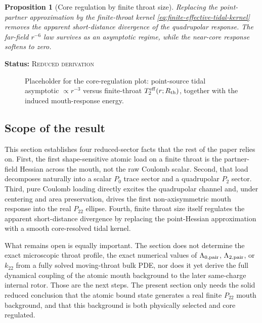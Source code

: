 \documentclass[11pt]{article}
\theoremstyle{plain}
\newtheorem{proposition}[theorem]{Proposition}
\theoremstyle{definition}
\theoremstyle{remark}
\newcommand{\statusReduced}{\textsc{Reduced derivation}}
\newcommand{\claimstatus}[1]{\par\smallskip\noindent\textbf{Status:} #1\par\smallskip}
\newcommand{\Ptwotwo}{P_{22}}
\newcommand{\Rth}{R_{\mathrm{th}}}
\begin{document}
\begin{proposition}[Core regulation by finite throat size]\label{prop:finite-core-regulation}
Replacing the point-partner approximation by the finite-throat kernel \cref{eq:finite-effective-tidal-kernel} removes the apparent short-distance divergence of the quadrupolar response. The far-field $r^{-6}$ law survives as an asymptotic regime, while the near-core response softens to zero.
\end{proposition}
\claimstatus{\statusReduced}

\begin{figure}[t]
    \centering
    \fbox{\rule{0pt}{1.8in}\rule{0.92\linewidth}{0pt}}
    \caption{Placeholder for the core-regulation plot: point-source tidal asymptotic $\propto r^{-3}$ versus finite-throat $T_2^{\rm eff}(r;\Rth)$, together with the induced mouth-response energy.}
    \label{fig:finite-core-reg}
\end{figure}

\subsection{Scope of the result}\label{subsec:finite-response-scope}

This section establishes four reduced-sector facts that the rest of the paper relies on. First, the first shape-sensitive atomic load on a finite throat is the partner-field Hessian across the mouth, not the raw Coulomb scalar. Second, that load decomposes naturally into a scalar $P_0$ trace sector and a quadrupolar $P_2$ sector. Third, pure Coulomb loading directly excites the quadrupolar channel and, under centering and area preservation, drives the first non-axisymmetric mouth response into the real \(\Ptwotwo\) ellipse. Fourth, finite throat size itself regulates the apparent short-distance divergence by replacing the point-Hessian approximation with a smooth core-resolved tidal kernel.

What remains open is equally important. The section does not determine the exact microscopic throat profile, the exact numerical values of $\Lambda_{0,\rm pair}$, $\Lambda_{2,\rm pair}$, or $k_{22}$ from a fully solved moving-throat bulk PDE, nor does it yet derive the full dynamical coupling of the atomic mouth background to the later same-charge internal rotor. Those are the next steps. The present section only needs the solid reduced conclusion that the atomic bound state generates a real finite \(\Ptwotwo\) mouth background, and that this background is both physically selected and core regulated.
\end{document}
